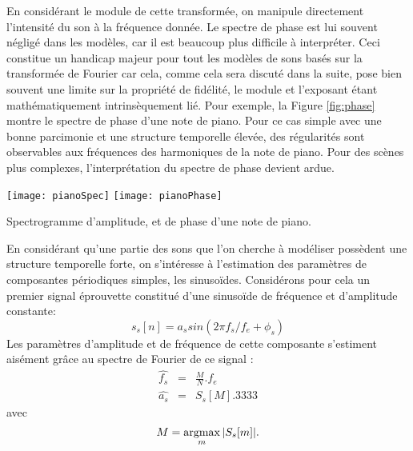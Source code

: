 En considérant le module de cette transformée, on manipule directement l'intensité du son à la fréquence donnée. Le spectre de phase est lui souvent négligé dans les modèles, car il est beaucoup plus difficile à interpréter. Ceci constitue un handicap majeur pour tout les modèles de sons basés sur la transformée de Fourier car cela, comme cela sera discuté dans la suite, pose bien souvent une limite sur la propriété de fidélité, le module et l'exposant étant mathématiquement intrinsèquement lié. Pour exemple, la Figure \ref{fig:phase} montre le spectre de phase d'une note de piano. Pour ce cas simple avec une bonne parcimonie et une structure temporelle élevée, des régularités sont observables aux fréquences des harmoniques de la note de piano. Pour des scènes plus complexes, l'interprétation du spectre de phase devient ardue.

\begin{marginfigure}
  \texttt{[image: pianoSpec]}
  \texttt{[image: pianoPhase]}
  \caption{Spectrogramme d'amplitude, et de phase d'une note de piano.}
  \label{fig:phase}
\end{marginfigure}

En considérant qu'une partie des sons que l'on cherche à modéliser possèdent une structure temporelle forte, on s'intéresse à l'estimation des paramètres de composantes périodiques simples, les sinusoïdes. Considérons pour cela un premier signal \og éprouvette \fg constitué d'une sinusoïde de fréquence et d'amplitude constante:
\begin{equation}
  s_s[n] = a_s sin(2\pi f_s/f_e + \phi_s)
  \label{eq:sin_toy}
\end{equation}
Les paramètres d'amplitude et de fréquence de cette composante s'estiment aisément grâce au spectre de Fourier de ce signal :
\begin{eqnarray}
  \hat{f_s} &=&  \frac{M}{N} . f_e\\
  \hat{a_s} &=& S_s[M].3333
\end{eqnarray}
avec
\begin{equation}
  M = \operatorname*{argmax}_m | S_s[m] |.
  \label{eq:sin_toy_select}
\end{equation}

